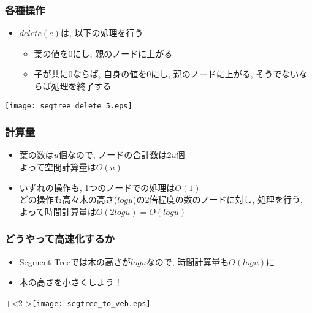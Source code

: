 \documentclass[dvipdfmx,12pt,notheorems]{beamer}
\theoremstyle{definition}
\begin{document}
\begin{frame}\frametitle{各種操作}
\begin{itemize}
\item $delete(e)$は, 以下の処理を行う
\begin{itemize}
\item 葉の値を$0$にし, 親のノードに上がる
\item 子が共に$0$ならば, 自身の値を$0$にし, 親のノードに上がる, そうでないならば処理を終了する
\end{itemize}
\end{itemize}
\texttt{[image: segtree\_delete\_5.eps]}
\end{frame}

\begin{frame}\frametitle{計算量}
\begin{itemize}
\item {}
\par \hspace{1em} 葉の数は$u$個なので, ノードの合計数は$2u$個\\よって空間計算量は$O(u)$
\item {}
\par \hspace{1em} いずれの操作も, 1つのノードでの処理は$O(1)$\\どの操作も高々木の高さ($logu$)の2倍程度の数のノードに対し, 処理を行う, よって時間計算量は$O(2logu) = O(logu)$
\end{itemize}
\end{frame}

\begin{frame}\frametitle{どうやって高速化するか}
\begin{itemize}
\item Segment Treeでは木の高さが$logu$なので, 時間計算量も$O(logu)$に
\item<2-> 木の高さを小さくしよう！
\end{itemize}
\onslide+<2->{\texttt{[image: segtree\_to\_veb.eps]}}
\end{frame}
\end{document}
